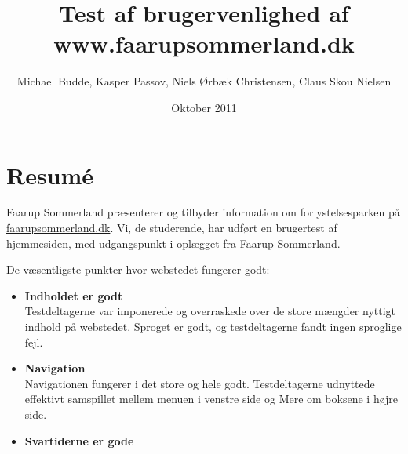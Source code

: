 \documentclass[10pt,a4paper]{article}      %
\author{Michael Budde, Kasper Passov, Niels Ørbæk Christensen, Claus Skou Nielsen}
\title{Test af brugervenlighed af www.faarupsommerland.dk}
\date{Oktober 2011}
\begin{document}
\maketitle
\newpage
\setcounter{page}{1}

\section*{Resumé}
\setcounter{page}{1} %

Faarup Sommerland præsenterer og tilbyder information om forlystelsesparken på
\url{faarupsommerland.dk}. Vi, de studerende, har udført en brugertest af
hjemmesiden, med udgangspunkt i oplægget fra Faarup Sommerland.




\noindent De væsentligste punkter hvor webstedet fungerer godt:
\begin{itemize}
  \item \textbf{Indholdet er godt}\\ Testdeltagerne var imponerede og overraskede over de store mængder nyttigt indhold på webstedet. Sproget er godt, og testdeltagerne fandt ingen sproglige fejl.
  \item \textbf{Navigation}\\ Navigationen fungerer i det store og hele godt. Testdeltagerne udnyttede effektivt samspillet mellem menuen i venstre side og Mere om boksene i højre side.
  \item \textbf{Svartiderne er gode}
\end{itemize}
\end{document}
